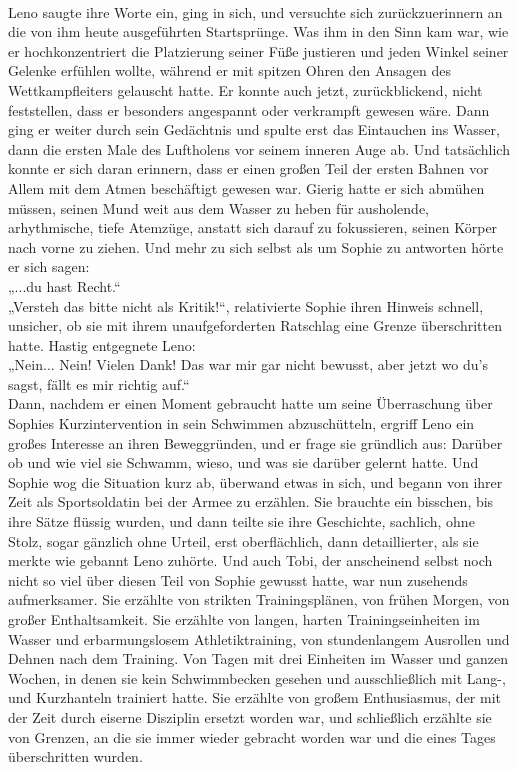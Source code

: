 \documentclass[ngerman,smalldemyvopaper,11pt,oneside,onecolumn,openright,extrafontsizes]{memoir}
\begin{document}
\vspace{0.5em} \\
Leno saugte ihre Worte ein, ging in sich, und versuchte sich zurückzuerinnern an die von ihm heute ausgeführten Startsprünge. Was ihm in den Sinn kam war, wie er hochkonzentriert die Platzierung seiner Füße justieren und jeden Winkel seiner Gelenke erfühlen wollte, während er mit spitzen Ohren den Ansagen des Wettkampfleiters gelauscht hatte. Er konnte auch jetzt, zurückblickend, nicht feststellen, dass er besonders angespannt oder verkrampft gewesen wäre. Dann ging er weiter durch sein Gedächtnis und spulte erst das Eintauchen ins Wasser, dann die ersten Male des Luftholens vor seinem inneren Auge ab. Und tatsächlich konnte er sich daran erinnern, dass er einen großen Teil der ersten Bahnen vor Allem mit dem Atmen beschäftigt gewesen war. Gierig hatte er sich abmühen müssen, seinen Mund weit aus dem Wasser zu heben für ausholende, arhythmische, tiefe Atemzüge, anstatt sich darauf zu fokussieren, seinen Körper nach vorne zu ziehen. Und mehr zu sich selbst als um Sophie zu antworten hörte er sich sagen:
\vspace{0.5em} \\
„...du hast Recht.“
\vspace{0.5em} \\
„Versteh das bitte nicht als Kritik!“, relativierte Sophie ihren Hinweis schnell, unsicher, ob sie mit ihrem unaufgeforderten Ratschlag eine Grenze überschritten hatte. Hastig entgegnete Leno:
\vspace{0.5em} \\
„Nein... Nein! Vielen Dank! Das war mir gar nicht bewusst, aber jetzt wo du's sagst, fällt es mir richtig auf.“\\
Dann, nachdem er einen Moment gebraucht hatte um seine Überraschung über Sophies Kurzintervention in sein Schwimmen abzuschütteln, ergriff Leno ein großes Interesse an ihren Beweggründen, und er frage sie gründlich aus: Darüber ob und wie viel sie Schwamm, wieso, und was sie darüber gelernt hatte. Und Sophie wog die Situation kurz ab, überwand etwas in sich, und begann von ihrer Zeit als Sportsoldatin bei der Armee zu erzählen. Sie brauchte ein bisschen, bis ihre Sätze flüssig wurden, und dann teilte sie ihre Geschichte, sachlich, ohne Stolz, sogar gänzlich ohne Urteil, erst oberflächlich, dann detaillierter, als sie merkte wie gebannt Leno zuhörte. Und auch Tobi, der anscheinend selbst noch nicht so viel über diesen Teil von Sophie gewusst hatte, war nun zusehends aufmerksamer. Sie erzählte von strikten Trainingsplänen, von frühen Morgen, von großer Enthaltsamkeit. Sie erzählte von langen, harten Trainingseinheiten im Wasser und erbarmungslosem Athletiktraining, von stundenlangem Ausrollen und Dehnen nach dem Training. Von Tagen mit drei Einheiten im Wasser und ganzen Wochen, in denen sie kein Schwimmbecken gesehen und ausschließlich mit Lang-, und Kurzhanteln trainiert hatte. Sie erzählte von großem Enthusiasmus, der mit der Zeit durch eiserne Disziplin ersetzt worden war, und schließlich erzählte sie von Grenzen, an die sie immer wieder gebracht worden war und die eines Tages überschritten wurden. \\
\end{document}
